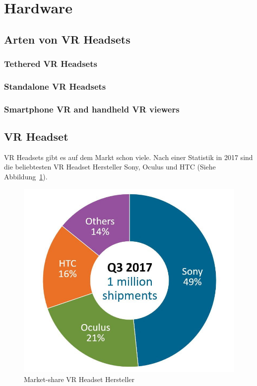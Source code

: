 \section{Hardware}

\subsection{Arten von VR Headsets}\label{sec:vr-headset-types}

\subsubsection{Tethered VR Headsets}

\subsubsection{Standalone VR Headsets}

\subsubsection{Smartphone VR and handheld VR viewers}

\subsection{VR Headset}\label{sec:vr-headset}

VR Headsets gibt es auf dem Markt schon viele.
Nach einer Statistik in 2017 sind die beliebtesten VR Headset Hersteller Sony, Oculus und HTC (Siehe Abbildung~\ref{fig:vr_headset_manufacturer_marketshare}).

\begin{figure}
    \includegraphics[scale=0.5]{pics/vr_headset_manufacturer_marketshare}
    \caption{Market-share VR Headset Hersteller~\cite{MARTINDALE_2017}}
    \label{fig:vr_headset_manufacturer_marketshare}
\end{figure}

